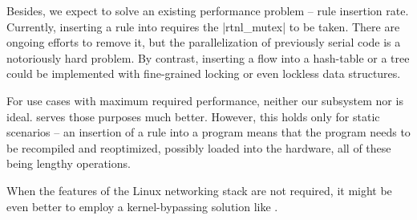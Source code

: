 Besides, we expect to solve an existing performance problem -- rule insertion rate.
Currently, inserting a rule into  requires the \struct|rtnl_mutex| to be
taken. There are ongoing efforts to remove it, but the
parallelization of previously serial code is a notoriously hard problem. By
contrast, inserting a flow into a hash-table or a tree could be implemented
with fine-grained locking or even lockless data structures.

For use cases with maximum required performance, neither our subsystem nor
 is ideal.  serves those purposes much better. However, this holds only for
static scenarios -- an insertion of a rule into a  program means that the
program needs to be recompiled and reoptimized, possibly loaded into the
hardware, all of these being lengthy operations.

When the features of the Linux networking stack are not required, it might be
even better to employ a kernel-bypassing solution like .

